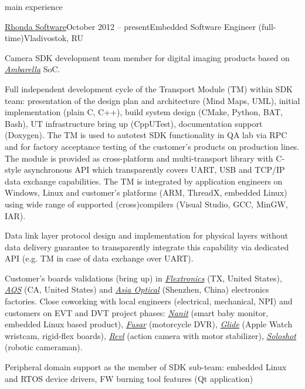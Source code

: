 \documentclass{template}
\begin{document}
\begin{rSection}{main experience}
\begin{rCompany}{\href{http://www.rhondasoftware.com}{Rhonda Software}}{October 2012 -- present}{Embedded Software Engineer (full-time)}{Vladivostok, RU}

\item Camera SDK development team member for digital imaging products based on \href{http://www.ambarella.com}{\textit{Ambarella}} SoC.
\item Full independent development cycle of the Transport Module (TM) within SDK team: presentation of the design plan and architecture
      (Mind Maps, UML), initial implementation (plain C, C++), build system design (CMake, Python, BAT, Bash), UT infrastructure bring up
      (CppUTest), documentation support (Doxygen). The TM is used to autotest SDK functionality in QA lab via RPC and for factory acceptance
      testing of the customer's products on production lines. The module is provided as cross-platform and multi-transport library with C-style
      asynchronous API which transparently covers UART, USB and TCP/IP data exchange capabilities. The TM is integrated by application engineers
      on Windows, Linux and customer's platforms (ARM, ThreadX, embedded Linux) using wide range of supported (cross)compilers (Visual Studio,
      GCC, MinGW, IAR).
\item Data link layer protocol design and implementation for physical layers without data delivery guarantee to transparently integrate this
      capability via dedicated API (e.g. TM in case of data exchange over UART).
\item Customer's boards validations (bring up) in \href{http://www.flextronics.com}{\textit{Flextronics}} (TX, United States),
      \href{http://aqs-inc.com}{\textit{AQS}} (CA, United States) and \href{http://www.asia-optical.com/}{\textit{Asia Optical}} (Shenzhen, China)
      electronics factories. Close coworking with local engineers (electrical, mechanical, NPI) and customers on EVT and DVT
      project phases: \href{https://www.nanit.com}{\textit{Nanit}} (smart baby monitor, embedded Linux based product), \href{https://fusar.com}{\textit{Fusar}}
      (motorcycle DVR), \href{http://www.glide.me}{\textit{Glide}} (Apple Watch wristcam, rigid-flex boards), \href{https://revl.com}{\textit{Revl}}
      (action camera with motor stabilizer), \href{https://www.soloshot.com}{\textit{Soloshot}} (robotic cameraman).
\item Peripheral domain support as the member of SDK sub-team: embedded Linux and RTOS device drivers, FW burning tool features (Qt application)

\end{rCompany}
\end{rSection}
\end{document}
